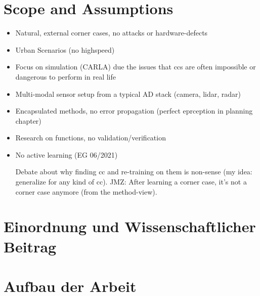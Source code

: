 \section{Scope and Assumptions}

\begin{itemize}
    \item Natural, external corner cases, no attacks or hardware-defects
\item Urban Scenarios (no highspeed)
\item Focus on simulation (CARLA) due the issues that ccs are often impossible or dangerous to perform in real life
\item Multi-modal sensor setup from a typical AD stack (camera, lidar, radar)
\item Encapsulated methods, no error propagation (perfect eprception in planning chapter)
\item Research on functions, no validation/verification
\item No active learning (EG 06/2021)

Debate about why finding cc and re-training on them is non-sense (my idea: generalize for any kind of cc). JMZ: After learning a corner case, it's not a corner case anymore (from the method-view).


\end{itemize}

\section{Einordnung und Wissenschaftlicher Beitrag}

\section{Aufbau der Arbeit}


